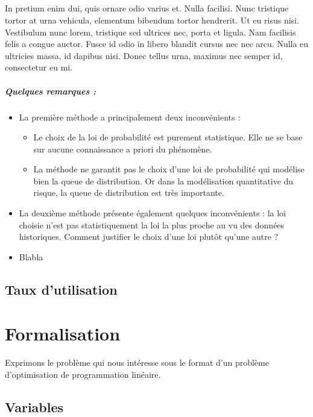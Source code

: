 \documentclass[11pt,a4paper]{report}
\begin{document}
\paragraph{}
In pretium enim dui, quis ornare odio varius et. Nulla facilisi. Nunc tristique tortor at urna vehicula, elementum bibendum tortor hendrerit. Ut eu risus nisi. Vestibulum nunc lorem, tristique sed ultrices nec, porta et ligula. Nam facilisis felis a congue auctor. Fusce id odio in libero blandit cursus nec nec arcu. Nulla eu ultricies massa, id dapibus nisi. Donec tellus urna, maximus nec semper id, consectetur eu mi.

\paragraph{Quelques remarques :}
\begin{itemize}
    \item La première méthode a principalement deux inconvénients :
    \begin{itemize}
        \item Le choix de la loi de probabilité est purement statistique. Elle ne se base sur aucune connaissance a priori du phénomène.
        \item La méthode ne garantit pas le choix d’une loi de probabilité qui modélise bien la queue de distribution. Or dans la modélisation quantitative du risque, la queue de distribution est très importante.
    \end{itemize}
    \item La deuxième méthode présente également quelques inconvénients : la loi choisie n’est pas statistiquement la loi la plus proche au vu des données historiques. Comment justifier le choix d’une loi plutôt qu’une autre ?
    \item Blabla
\end{itemize}

\section{Taux d'utilisation}

\newpage

\chapter{Formalisation}
Exprimons le problème qui nous intéresse sous le format d'un problème d'optimisation de programmation linéaire.

\section{Variables}
\end{document}

